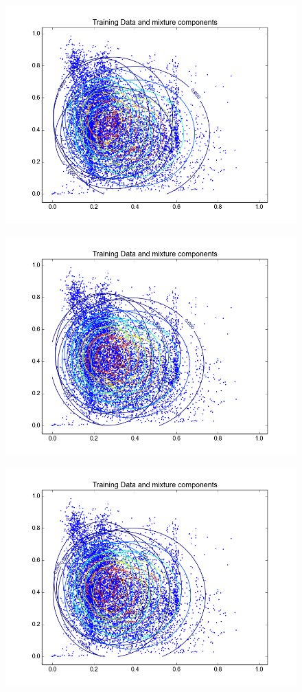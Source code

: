 \documentclass[11pt,a4paper]{article}
\begin{document}
\begin{minipage}[b]{0.25\textwidth}
\begin{figure}[H]
  \centering
  \includegraphics[width=.8\linewidth]{Figures/contours_diagforest0.png}
\end{figure}%
\end{minipage}
\begin{minipage}[b]{0.25\textwidth}
\begin{figure}[H]
  \centering
  \includegraphics[width=.8\linewidth]{Figures/contours_diagforest5.png}

  \label{fig:sfig1}
\end{figure}%
\end{minipage}
\begin{minipage}[b]{0.25\textwidth}
\begin{figure}[H]
  \centering
  \includegraphics[width=.8\linewidth]{Figures/contours_diagforest15.png}

  \label{fig:sfig1}
\end{figure}%
\end{minipage}
\end{document}
